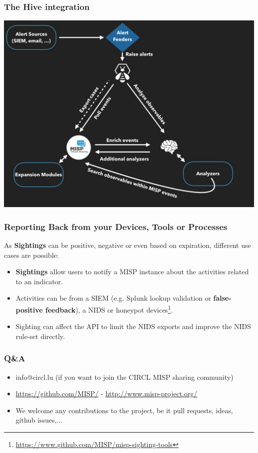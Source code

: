 \begin{frame}
    \frametitle{The Hive integration}
    \includegraphics[scale=0.25]{screenshots/cortex.jpg}
\end{frame}

\begin{frame}
\frametitle{Reporting Back from your Devices, Tools or Processes}
As {\bf Sightings} can be positive, negative or even based on expiration, different use cases are possible:
\begin{itemize}
\item {\bf Sightings} allow users to notify a MISP instance about the activities related to an indicator.
\item Activities can be from a SIEM (e.g. Splunk lookup validation or {\bf false-positive feedback}), a NIDS or honeypot devices\footnote{\url{https://www.github.com/MISP/misp-sighting-tools}}.
\item Sighting can affect the API to limit the NIDS exports and improve the NIDS rule-set directly.
\end{itemize}
\end{frame}

\begin{frame}
        \frametitle{Q\&A}
        \begin{itemize}
                \item info@circl.lu (if you want to join the CIRCL MISP sharing community)
                \item \url{https://github.com/MISP/} - \url{http://www.misp-project.org/}
                \item We welcome any contributions to the project, be it pull requests, ideas, github issues,...
        \end{itemize}
\end{frame}


